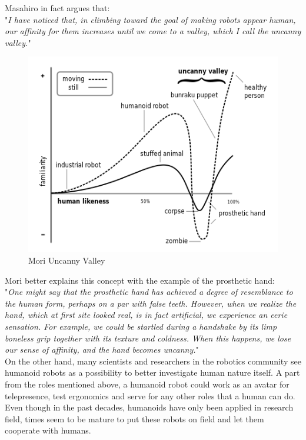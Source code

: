 Masahiro in fact argues that:\\
"\textit{I have noticed that, in climbing toward the goal of making robots appear human, our affinity for them increases until we come to a valley, which I call the uncanny valley.}"
\begin{figure}[H]
    \centering
    \includegraphics[scale=0.8]{Images/Chapter 3/Mori_Uncanny_Valley.png}
    \caption{Mori Uncanny Valley}
    \label{fig:mori_uncanny_valley}
\end{figure}
Mori better explains this concept with the example of the prosthetic hand:
\\
"\textit{One might say that the prosthetic hand has achieved a degree of resemblance to the human form, perhaps on a par with false teeth. However, when we realize the hand, which at first site looked real, is in fact artificial, we experience an eerie sensation. For example, we could be startled during a handshake by its limp boneless grip together with its texture and coldness. When this happens, we lose our sense of affinity, and the hand becomes uncanny.}"
\\
On the other hand, many scientists and researchers in the robotics community see humanoid robots as a possibility to better investigate human nature itself.
A part from the roles mentioned above, a humanoid robot could work as an avatar for telepresence, test ergonomics and serve for any other  roles that a human can do.
Even though in the past decades, humanoids have only been applied in research field, times seem to be mature to put these robots on field and let them cooperate with humans.





